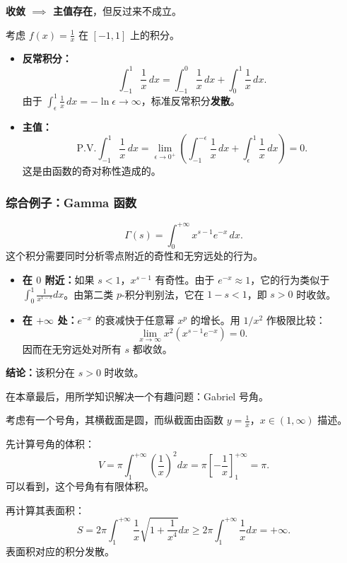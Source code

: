 \begin{remark}
\textbf{收敛 $\implies$ 主值存在}，但反过来不成立。
\end{remark}

\begin{example}
考虑 $f(x)=\frac{1}{x}$ 在 $[-1,1]$ 上的积分。
\begin{itemize}
    \item \textbf{反常积分：}
    \[
    \int_{-1}^{1}\frac{1}{x}\,dx=\int_{-1}^{0}\frac{1}{x}\,dx+\int_0^1\frac{1}{x}\,dx.
    \]
    由于 $\int_{\epsilon}^{1}\frac{1}{x}\,dx=-\ln\epsilon\to\infty$，标准反常积分\textbf{发散}。
    \item \textbf{主值：}
    \[
    \text{P.V.}\int_{-1}^{1}\frac{1}{x}\,dx=\lim_{\epsilon\to 0^+}\left(\int_{-1}^{-\epsilon}\frac{1}{x}\,dx+\int_{\epsilon}^{1}\frac{1}{x}\,dx\right)=0.
    \]
    这是由函数的奇对称性造成的。
\end{itemize}
\end{example}

\subsubsection{综合例子：Gamma 函数}
\[
\Gamma(s)=\int_0^{+\infty}x^{s-1}e^{-x}\,dx.
\]
这个积分需要同时分析零点附近的奇性和无穷远处的行为。
\begin{itemize}
    \item \textbf{在 $0$ 附近：}如果 $s<1$，$x^{s-1}$ 有奇性。由于 $e^{-x}\approx 1$，它的行为类似于 $\int_0^1\frac{1}{x^{1-s}}dx$。由第二类 $p$-积分判别法，它在 $1-s<1$，即 $s>0$ 时收敛。
    \item \textbf{在 $+\infty$ 处：}$e^{-x}$ 的衰减快于任意幂 $x^p$ 的增长。用 $1/x^2$ 作极限比较：
    \[
    \lim_{x\to\infty}x^2(x^{s-1}e^{-x})=0.
    \]
    因而在无穷远处对所有 $s$ 都收敛。
\end{itemize}
\textbf{结论：}该积分在 $s>0$ 时收敛。

在本章最后，用所学知识解决一个有趣问题：Gabriel 号角。

考虑有一个号角，其横截面是圆，而纵截面由函数 $y=\frac{1}{x}$，$x\in(1,\infty)$ 描述。

先计算号角的体积：
\[
V=\pi\int_1^{+\infty}\left(\frac{1}{x}\right)^2dx=\pi\left[-\frac{1}{x}\right]_1^{+\infty}=\pi.
\]
可以看到，这个号角有有限体积。

再计算其表面积：
\[
S=2\pi\int_1^{+\infty}\frac{1}{x}\sqrt{1+\frac{1}{x^4}}dx\ge 2\pi\int_1^{+\infty}\frac{1}{x}dx=+\infty.
\]
表面积对应的积分发散。

